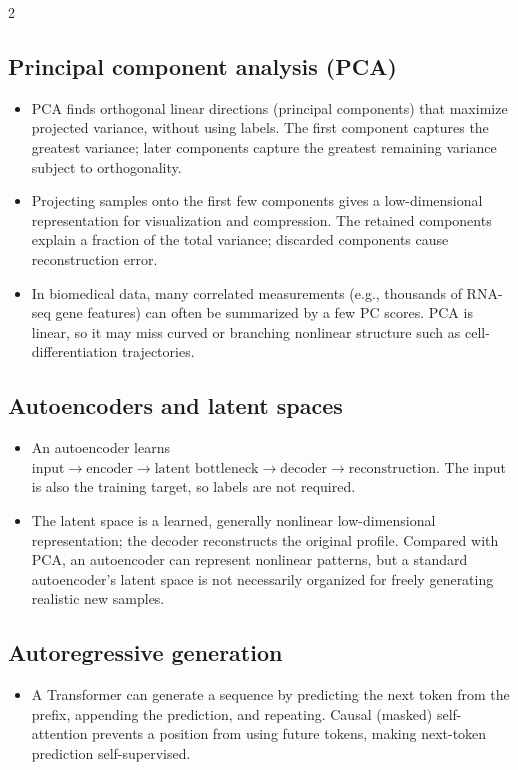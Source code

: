 \documentclass[10pt,a4paper]{ctexart}
\begin{document}
\begin{multicols*}{2}
\subsection{Principal component analysis (PCA)}
\begin{itemize}
  \item PCA finds orthogonal linear directions (principal components) that maximize projected variance,
  without using labels. The first component captures the greatest variance; later components capture
  the greatest remaining variance subject to orthogonality.
  \item Projecting samples onto the first few components gives a low-dimensional representation for
  visualization and compression. The retained components explain a fraction of the total variance;
  discarded components cause reconstruction error.
  \item In biomedical data, many correlated measurements (e.g., thousands of RNA-seq gene features)
  can often be summarized by a few PC scores. PCA is linear, so it may miss curved or branching
  nonlinear structure such as cell-differentiation trajectories.
\end{itemize}

\subsection{Autoencoders and latent spaces}
\begin{itemize}
  \item An autoencoder learns \(\text{input}\to\text{encoder}\to\text{latent bottleneck}\to\text{decoder}\to\text{reconstruction}\).
  The input is also the training target, so labels are not required.
  \item The latent space is a learned, generally nonlinear low-dimensional representation; the decoder
  reconstructs the original profile. Compared with PCA, an autoencoder can represent nonlinear
  patterns, but a standard autoencoder's latent space is not necessarily organized for freely
  generating realistic new samples.
\end{itemize}

\subsection{Autoregressive generation}
\begin{itemize}
  \item A Transformer can generate a sequence by predicting the next token from the prefix,
  appending the prediction, and repeating. Causal (masked) self-attention prevents a position
  from using future tokens, making next-token prediction self-supervised.
\end{itemize}



\end{multicols*}
\end{document}
